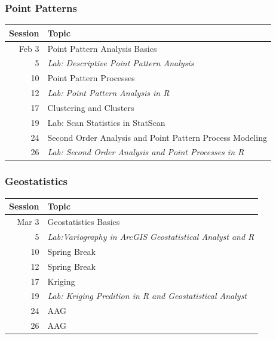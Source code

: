 \documentclass[nototal,handout]{beamer}
\begin{document}
\begin{frame}
	\frametitle{Point Patterns}
  \begin{center}
  \begin{tabular}{|rl|}
  \hline
  Session&Topic\\
  \hline
  Feb 3&Point Pattern Analysis Basics\\
    5&\emph{Lab: Descriptive Point Pattern Analysis}\\
 10&Point Pattern Processes\\
 12&\emph{Lab: Point Pattern Analysis in \emph{R}}\\
 17&Clustering and Clusters\\
 19&Lab: Scan Statistics in StatScan\\
 24&Second Order Analysis and Point Pattern Process Modeling \\
 26&\emph{Lab: Second Order Analysis and Point Processes in R}   \\
  \hline
  \end{tabular}
  \end{center}
 \end{frame} 

\begin{frame}
	\frametitle{Geostatistics}
  \begin{center}
  \begin{tabular}{|rl|}
  \hline
  Session&Topic\\
  \hline
  Mar 3&Geostatistics Basics\\
  5&\emph{Lab:Variography in ArcGIS Geostatistical Analyst and R}\\
  10&Spring Break\\
  12&Spring Break\\
  17&Kriging\\
  19&\emph{Lab: Kriging Predition in R and Geostatistical Analyst}\\
  24&AAG\\
  26&AAG\\
  \hline
  \end{tabular}
  \end{center}
 \end{frame} 
\end{document}
